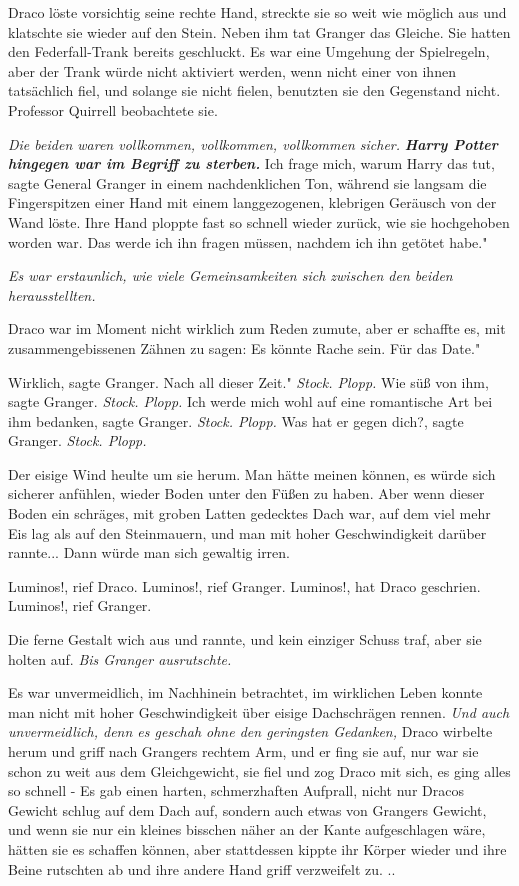 Draco löste vorsichtig seine rechte Hand, streckte sie so weit wie möglich aus
und klatschte sie wieder auf den Stein. Neben ihm tat Granger das Gleiche. Sie
hatten den Federfall-Trank bereits geschluckt. Es war eine Umgehung der
Spielregeln, aber der Trank würde nicht aktiviert werden, wenn nicht einer von
ihnen tatsächlich fiel, und solange sie nicht fielen, benutzten sie den
Gegenstand nicht. Professor Quirrell beobachtete sie.

\emph{Die beiden waren vollkommen, vollkommen, vollkommen sicher.}
\textbf{\emph{Harry Potter hingegen war im Begriff zu sterben.}}\textbf{} \glqq{}
Ich frage mich, warum Harry das tut\grqq{}, sagte General Granger in einem
nachdenklichen Ton, während sie langsam die Fingerspitzen einer Hand mit einem
langgezogenen, klebrigen Geräusch von der Wand löste. Ihre Hand ploppte fast so
schnell wieder zurück, wie sie hochgehoben worden war. \glqq{}Das werde ich ihn
fragen müssen, nachdem ich ihn getötet habe."

\emph{Es war erstaunlich, wie viele Gemeinsamkeiten sich zwischen den beiden
herausstellten.}

Draco war im Moment nicht wirklich zum Reden zumute, aber er schaffte es, mit
zusammengebissenen Zähnen zu sagen: \glqq{}Es könnte Rache sein. Für das Date."

\glqq{}Wirklich\grqq{}, sagte Granger. \glqq{}Nach all dieser Zeit."
\emph{Stock. Plopp.}
\glqq{}Wie süß von ihm\grqq{}, sagte Granger.
\emph{Stock. Plopp.}
\glqq{}Ich werde mich wohl auf eine romantische Art bei ihm bedanken\grqq{},
sagte Granger.
\emph{Stock. Plopp.}
\glqq{}Was hat er gegen dich?\grqq{}, sagte Granger.
\emph{Stock. Plopp.}

Der eisige Wind heulte um sie herum. Man hätte meinen können, es würde sich
sicherer anfühlen, wieder Boden unter den Füßen zu haben. Aber wenn dieser Boden
ein schräges, mit groben Latten gedecktes Dach war, auf dem viel mehr Eis lag
als auf den Steinmauern, und man mit hoher Geschwindigkeit darüber rannte...
Dann würde man sich gewaltig irren.

\glqq{}Luminos!\grqq{}, rief Draco. \glqq{}Luminos!\grqq{}, rief Granger. \glqq{}
Luminos!\grqq{}, hat Draco geschrien. \glqq{}Luminos!\grqq{}, rief Granger.

Die ferne Gestalt wich aus und rannte, und kein einziger Schuss traf, aber sie
holten auf. \emph{ Bis Granger ausrutschte.}

Es war unvermeidlich, im Nachhinein betrachtet, im wirklichen Leben konnte man
nicht mit hoher Geschwindigkeit über eisige Dachschrägen rennen.
\emph{Und auch unvermeidlich, denn es geschah ohne den geringsten Gedanken,}
Draco wirbelte herum und griff nach Grangers rechtem Arm, und er fing sie auf,
nur war sie schon zu weit aus dem Gleichgewicht, sie fiel und zog Draco mit
sich, es ging alles so schnell - Es gab einen harten, schmerzhaften Aufprall,
nicht nur Dracos Gewicht schlug auf dem Dach auf, sondern auch etwas von
Grangers Gewicht, und wenn sie nur ein kleines bisschen näher an der Kante
aufgeschlagen wäre, hätten sie es schaffen können, aber stattdessen kippte ihr
Körper wieder und ihre Beine rutschten ab und ihre andere Hand griff verzweifelt
zu. ..

